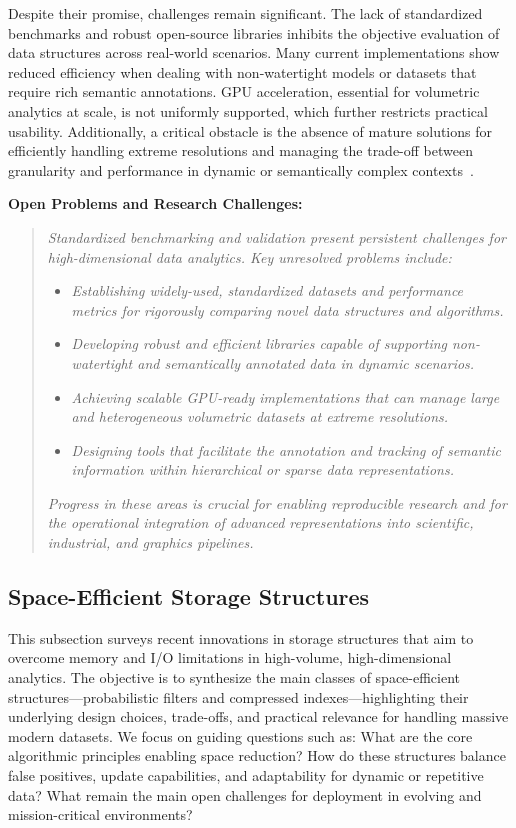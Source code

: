 \documentclass[sigconf]{acmart}
\begin{document}
Despite their promise, challenges remain significant. The lack of standardized benchmarks and robust open-source libraries inhibits the objective evaluation of data structures across real-world scenarios. Many current implementations show reduced efficiency when dealing with non-watertight models or datasets that require rich semantic annotations. GPU acceleration, essential for volumetric analytics at scale, is not uniformly supported, which further restricts practical usability. Additionally, a critical obstacle is the absence of mature solutions for efficiently handling extreme resolutions and managing the trade-off between granularity and performance in dynamic or semantically complex contexts~\cite{ref86}.

\textbf{Open Problems and Research Challenges:}
\begin{quote}
\textit{Standardized benchmarking and validation present persistent challenges for high-dimensional data analytics. Key unresolved problems include:}
\begin{itemize}
    \item \textit{Establishing widely-used, standardized datasets and performance metrics for rigorously comparing novel data structures and algorithms.}
    \item \textit{Developing robust and efficient libraries capable of supporting non-watertight and semantically annotated data in dynamic scenarios.}
    \item \textit{Achieving scalable GPU-ready implementations that can manage large and heterogeneous volumetric datasets at extreme resolutions.}
    \item \textit{Designing tools that facilitate the annotation and tracking of semantic information within hierarchical or sparse data representations.}
\end{itemize}
\textit{Progress in these areas is crucial for enabling reproducible research and for the operational integration of advanced representations into scientific, industrial, and graphics pipelines.}
\end{quote}

\subsection{Space-Efficient Storage Structures}

This subsection surveys recent innovations in storage structures that aim to overcome memory and I/O limitations in high-volume, high-dimensional analytics. The objective is to synthesize the main classes of space-efficient structures—probabilistic filters and compressed indexes—highlighting their underlying design choices, trade-offs, and practical relevance for handling massive modern datasets. We focus on guiding questions such as: What are the core algorithmic principles enabling space reduction? How do these structures balance false positives, update capabilities, and adaptability for dynamic or repetitive data? What remain the main open challenges for deployment in evolving and mission-critical environments?
\end{document}

